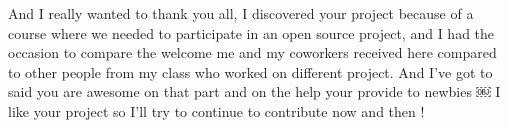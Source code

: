 \documentclass{beamer}
\begin{document}
    \begin{frame}
        \Huge
        \begin{center}
        \end{center}

    \end{frame}


\begin{frame}
    \begin{footnotesize}
        \begin{tcolorbox}[colback=github,colframe=blue!40!black,title=
                Julie Rymer - \href{https://gitter.im/Axelrod-Python/Axelrod?at=591388592b926f8a6741435d}
                {@Chadys} - (10 May 2017):
    ]
                And I really wanted to thank you all, I discovered your project because of a
                course where we needed to participate in an open source project, and I had the
                occasion to compare the welcome me and my coworkers received here compared to
                other people from my class who worked on different project. And I've got to said
                you are awesome on that part and on the help your provide to newbies ￼ I like
                your project so I'll try to continue to contribute now and then !
       \end{tcolorbox}
    \end{footnotesize}


\end{frame}
\end{document}

